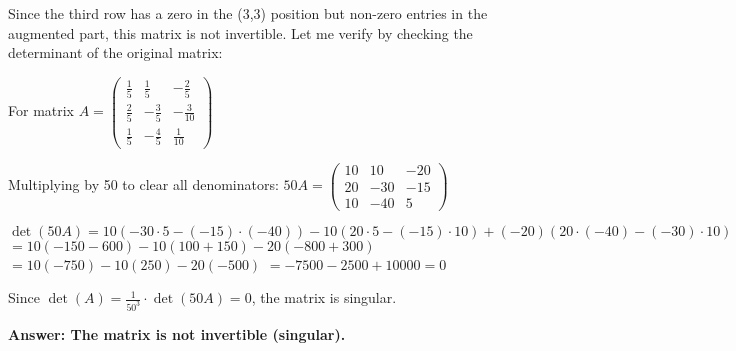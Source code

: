 Since the third row has a zero in the (3,3) position but non-zero entries in the augmented part, this matrix is not invertible. Let me verify by checking the determinant of the original matrix:

For matrix $A = \begin{pmatrix}
		\frac{1}{5} & \frac{1}{5}  & -\frac{2}{5}  \\
		\frac{2}{5} & -\frac{3}{5} & -\frac{3}{10} \\
		\frac{1}{5} & -\frac{4}{5} & \frac{1}{10}
	\end{pmatrix}$

Multiplying by 50 to clear all denominators:
$50A = \begin{pmatrix}
		10 & 10  & -20 \\
		20 & -30 & -15 \\
		10 & -40 & 5
	\end{pmatrix}$

$\det(50A) = 10(-30 \cdot 5 - (-15) \cdot (-40)) - 10(20 \cdot 5 - (-15) \cdot 10) + (-20)(20 \cdot (-40) - (-30) \cdot 10)$
$= 10(-150 - 600) - 10(100 + 150) - 20(-800 + 300)$
$= 10(-750) - 10(250) - 20(-500)$
$= -7500 - 2500 + 10000 = 0$

Since $\det(A) = \frac{1}{50^3} \cdot \det(50A) = 0$, the matrix is singular.

\textbf{Answer: The matrix is not invertible (singular).}